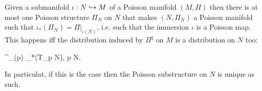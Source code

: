 \documentclass[main.tex]{subfiles}
\begin{document}
\begin{lemma}
\label{lemma:poisson_submanifold}
	Given a submanifold $\iota : N \hookrightarrow M$ of a Poisson manifold $(M, \Pi)$ then there is at most one Poisson structure $\Pi_N$ on $N$ that makes $(N, \Pi_N)$ a Poisson manifold such that $\iota_*(\Pi_N) = \Pi\vert_{\iota(N)}$, i.e. such that the immersion $\iota$ is a Poisson map. 
	This happens iff the distribution induced by $\Pi^\sharp$ on $M$ is a distribution on $N$ too:
	\begin{eqalign}
	\label{eq:poisson_submanifold_condition}
		\im \Pi^\sharp\vert_{\iota(p)} \subseteq \iota_*(T_p N), \quad \forall p \in N.
	\end{eqalign}
	In particulat, if this is the case then the Poisson substructure on $N$ is unique as such.
\end{lemma}
\end{document}
